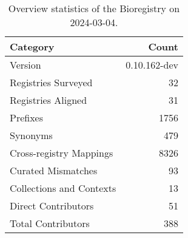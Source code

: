 \begin{table}
\caption{Overview statistics of the Bioregistry on 2024-03-04.}
\label{tab:bioregistry-summary}
\begin{tabular}{lr}
\toprule
Category & Count \\
\midrule
Version & 0.10.162-dev \\
Registries Surveyed & 32 \\
Registries Aligned & 31 \\
Prefixes & 1756 \\
Synonyms & 479 \\
Cross-registry Mappings & 8326 \\
Curated Mismatches & 93 \\
Collections and Contexts & 13 \\
Direct Contributors & 51 \\
Total Contributors & 388 \\
\bottomrule
\end{tabular}
\end{table}

